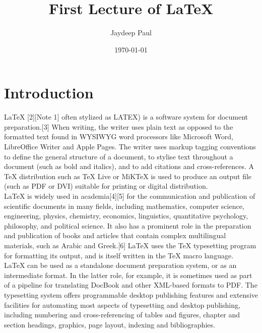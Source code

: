 \documentclass[a4paper,12pt]{report}
\title{First Lecture of \LaTeX}
\author{Jaydeep Paul}
\date{\today}
\begin{document}
	\maketitle
	\tableofcontents
	\chapter{Introduction}
	
	\hspace{2em}LaTeX [2][Note 1] often stylized as LATEX) is a software system for document preparation.[3] When writing, the writer uses plain text as opposed to the formatted text found in WYSIWYG word processors like Microsoft Word, LibreOffice Writer and Apple Pages. The writer uses markup tagging conventions to define the general structure of a document, to stylise text throughout a document (such as bold and italics), and to add citations and cross-references. A TeX distribution such as TeX Live or MiKTeX is used to produce an output file (such as PDF or DVI) suitable for printing or digital distribution.\\
	
	LaTeX is widely used in academia[4][5] for the communication and publication of scientific documents in many fields, including mathematics, computer science, engineering, physics, chemistry, economics, linguistics, quantitative psychology, philosophy, and political science. It also has a prominent role in the preparation and publication of books and articles that contain complex multilingual materials, such as Arabic and Greek.[6] LaTeX uses the TeX typesetting program for formatting its output, and is itself written in the TeX macro language.\\
	
	LaTeX can be used as a standalone document preparation system, or as an intermediate format. In the latter role, for example, it is sometimes used as part of a pipeline for translating DocBook and other XML-based formats to PDF. The typesetting system offers programmable desktop publishing features and extensive facilities for automating most aspects of typesetting and desktop publishing, including numbering and cross-referencing of tables and figures, chapter and section headings, graphics, page layout, indexing and bibliographies. \\
	
\end{document}
